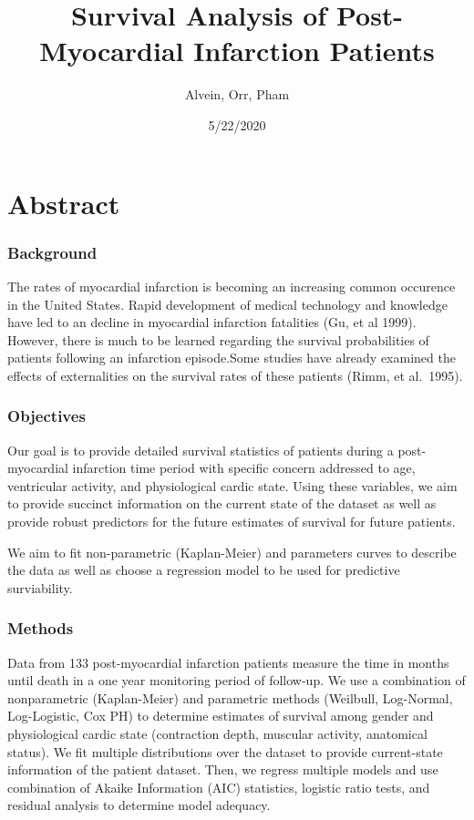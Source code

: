 \documentclass[
]{article}
\title{Survival Analysis of Post-Myocardial Infarction Patients}
\author{Alvein, Orr, Pham}
\date{5/22/2020}
\begin{document}
\maketitle

\hypertarget{abstract}{%
\section{Abstract}\label{abstract}}

\hypertarget{background}{%
\subsubsection{Background}\label{background}}

The rates of myocardial infarction is becoming an increasing common
occurence in the United States. Rapid development of medical technology
and knowledge have led to an decline in myocardial infarction fatalities
(Gu, et al 1999). However, there is much to be learned regarding the
survival probabilities of patients following an infarction episode.Some
studies have already examined the effects of externalities on the
survival rates of these patients (Rimm, et al.~1995).

\hypertarget{objectives}{%
\subsubsection{Objectives}\label{objectives}}

Our goal is to provide detailed survival statistics of patients during a
post-myocardial infarction time period with specific concern addressed
to age, ventricular activity, and physiological cardic state. Using
these variables, we aim to provide succinct information on the current
state of the dataset as well as provide robust predictors for the future
estimates of survival for future patients.

We aim to fit non-parametric (Kaplan-Meier) and parameters curves to
describe the data as well as choose a regression model to be used for
predictive surviability.

\hypertarget{methods}{%
\subsubsection{Methods}\label{methods}}

Data from 133 post-myocardial infarction patients measure the time in
months until death in a one year monitoring period of follow-up. We use
a combination of nonparametric (Kaplan-Meier) and parametric methods
(Weilbull, Log-Normal, Log-Logistic, Cox PH) to determine estimates of
survival among gender and physiological cardic state (contraction depth,
muscular activity, anatomical status). We fit multiple distributions
over the dataset to provide current-state information of the patient
dataset. Then, we regress multiple models and use combination of Akaike
Information (AIC) statistics, logistic ratio tests, and residual
analysis to determine model adequacy.
\end{document}
